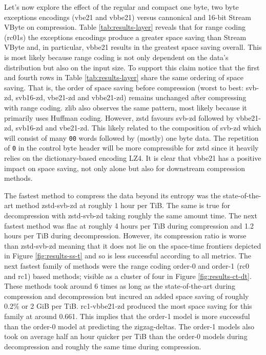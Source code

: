 Let's now explore the effect of the regular and compact one byte, two
byte exceptions encodings (vbe21 and vbbe21) versus cannonical and 16-bit Stream
VByte on compression. Table \ref{tab:results-layer} reveals that for range
coding (rc01s) the exceptions encodings produce a greater space saving than
Stream VByte and, in particular, vbbe21 results in the greatest space saving
overall. This is most likely because range coding is not only dependent on the
data's distribution but also on the input size. To support this claim
notice that the first and fourth rows in Table \ref{tab:results-layer} share the
same ordering of space saving. That is, the order of space saving before
compression (worst to best: svb-zd, svb16-zd, vbe21-zd and vbbe21-zd) remains
unchanged after compressing with range coding. zlib also observes the same
pattern, most likely because it primarily uses Huffman coding. However, zstd
favours svb-zd followed by vbbe21-zd, svb16-zd and vbe21-zd. This likely related
to the composition of svb-zd which will consist of many \texttt{00} words
followed by (mostly) one byte data. The repetition of \texttt{0} in the control
byte header will be more compressible for zstd since it heavily relies on
the dictionary-based encoding LZ4. It is clear that vbbe21 has a positive impact
on space saving, not only alone but also for downstream compression methods.

The fastest method to compress the data beyond its entropy was the
state-of-the-art method zstd-svb-zd at roughly 1 hour per TiB. The same is true
for decompression with zstd-svb-zd taking roughly the same amount time. The next
fastest method was flac at roughly 4 hours per TiB during compression and 1.2
hours per TiB during decompression. However, its compression ratio is worse than
zstd-svb-zd meaning that it does not lie on the space-time frontiers depicted in
Figure \ref{fig:results-ss-t} and so is less successful according to all
metrics. The next fastest family of methods were the range coding order-0 and
order-1 (rc0 and rc1) based methods;
visible as a cluster of four in Figure \ref{fig:results-ct-dt}. These methods
took around 6 times as long as the state-of-the-art during compression and
decompression but incured an added space saving of roughly 0.2\% or 2 GiB per
TiB. rc1-vbbe21-zd produced the most space saving for this family at around
0.661. This implies that the order-1 model is more successful than the order-0
model at predicting the zigzag-deltas. The order-1 models also took on average
half an hour quicker per TiB than the order-0 models during decompression and
roughly the same time during compression.

